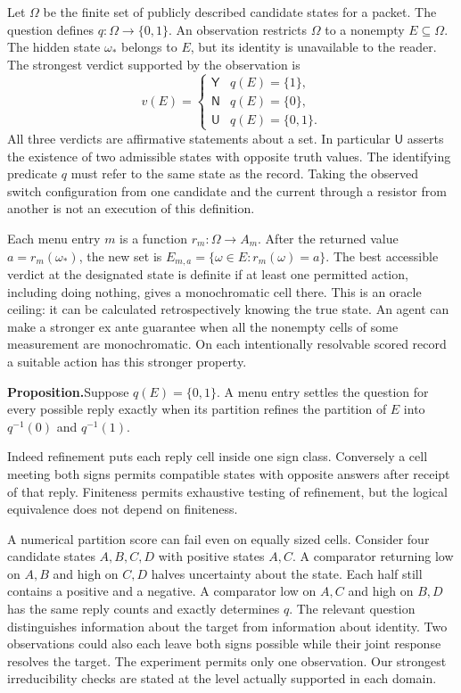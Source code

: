 \documentclass[12pt,letterpaper]{article}
\newcommand{\reading}[2]{\par\smallskip\textsf{\color{accent}\bfseries #1}\enspace #2\par}
\newcommand{\yes}{\mathsf Y}\newcommand{\no}{\mathsf N}\newcommand{\unk}{\mathsf U}
\begin{document}
Let $\Omega$ be the finite set of publicly described candidate states for a packet. The question defines $q:\Omega\to\{0,1\}$. An observation restricts $\Omega$ to a nonempty $E\subseteq\Omega$. The hidden state $\omega_*$ belongs to $E$, but its identity is unavailable to the reader. The strongest verdict supported by the observation is
\[
 v(E)=\begin{cases}\yes&q(E)=\{1\},\\
 \no&q(E)=\{0\},\\ \unk&q(E)=\{0,1\}.\end{cases}
\]
All three verdicts are affirmative statements about a set. In particular $\unk$ asserts the existence of two admissible states with opposite truth values. The identifying predicate $q$ must refer to the same state as the record. Taking the observed switch configuration from one candidate and the current through a resistor from another is not an execution of this definition.

Each menu entry $m$ is a function $r_m:\Omega\to A_m$. After the returned value $a=r_m(\omega_*)$, the new set is $E_{m,a}=\{\omega\in E:r_m(\omega)=a\}$. The best accessible verdict at the designated state is definite if at least one permitted action, including doing nothing, gives a monochromatic cell there. This is an oracle ceiling: it can be calculated retrospectively knowing the true state. An agent can make a stronger ex ante guarantee when all the nonempty cells of some measurement are monochromatic. On each intentionally resolvable scored record a suitable action has this stronger property.

\reading{Proposition.}{Suppose $q(E)=\{0,1\}$. A menu entry settles the question for every possible reply exactly when its partition refines the partition of $E$ into $q^{-1}(0)$ and $q^{-1}(1)$.}
Indeed refinement puts each reply cell inside one sign class. Conversely a cell meeting both signs permits compatible states with opposite answers after receipt of that reply. Finiteness permits exhaustive testing of refinement, but the logical equivalence does not depend on finiteness.

A numerical partition score can fail even on equally sized cells. Consider four candidate states $A,B,C,D$ with positive states $A,C$. A comparator returning low on $A,B$ and high on $C,D$ halves uncertainty about the state. Each half still contains a positive and a negative. A comparator low on $A,C$ and high on $B,D$ has the same reply counts and exactly determines $q$. The relevant question distinguishes information about the target from information about identity. Two observations could also each leave both signs possible while their joint response resolves the target. The experiment permits only one observation. Our strongest irreducibility checks are stated at the level actually supported in each domain.
\end{document}
